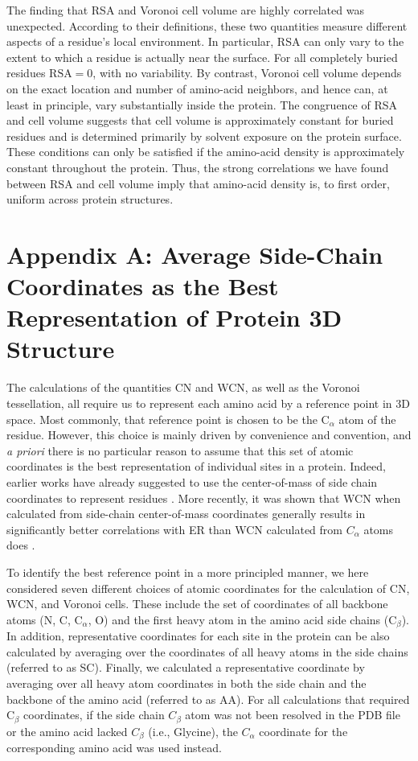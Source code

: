 \documentclass[12pt]{article}
\begin{document}
The finding that RSA and Voronoi cell volume are highly correlated was unexpected. According to their definitions, these two quantities measure different aspects of a residue's local environment. In particular, RSA can only vary to the extent to which a residue is actually near the surface. For all completely buried residues $\text{RSA}=0$, with no variability. By contrast, Voronoi cell volume depends on the exact location and number of amino-acid neighbors, and hence can, at least in principle, vary substantially inside the protein. The congruence of RSA and cell volume suggests that cell volume is approximately constant for buried residues and is determined primarily by solvent exposure on the protein surface. These conditions can only be satisfied if the amino-acid density is approximately constant throughout the protein. Thus, the strong correlations we have found between RSA and cell volume imply that amino-acid density is, to first order, uniform across protein structures.

\section*{Appendix A: Average Side-Chain Coordinates as the Best Representation of Protein 3D Structure}
\label{app:best_crd}

The calculations of the quantities CN and WCN, as well as the Voronoi tessellation, all require us to represent each amino acid by a reference point in 3D space. Most commonly, that reference point is chosen to be the C$_\alpha$ atom of the residue. However, this choice is mainly driven by convenience and convention, and \emph{a priori} there is no particular reason to assume that this set of atomic coordinates is the best representation of individual sites in a protein. Indeed, earlier works have already suggested to use the center-of-mass of side chain coordinates to represent residues \cite{soyer_voronoi_2000}. More recently, it was shown that WCN when calculated from side-chain center-of-mass coordinates generally results in significantly better correlations with ER than WCN calculated from $C_\alpha$ atoms does \cite{marcos_too_2015}.
    

    To identify the best reference point in a more principled manner, we here considered seven different choices of atomic coordinates for the calculation of CN, WCN, and Voronoi cells. These include the set of coordinates of all backbone atoms (N, C, C$_\alpha$, O) and the first heavy atom in the amino acid side chains (C$_\beta$). In addition, representative coordinates for each site in the protein can be also calculated by averaging over the coordinates of all heavy atoms in the side chains (referred to as SC). Finally, we calculated a representative coordinate by averaging over all heavy atom coordinates in both the side chain and the backbone of the amino acid (referred to as AA). For all calculations that required C$_\beta$ coordinates, if the side chain $C_\beta$ atom was not been resolved in the PDB file or the amino acid lacked $C_\beta$ (i.e., Glycine), the $C_\alpha$ coordinate for the corresponding amino acid was used instead.
    
\end{document}
